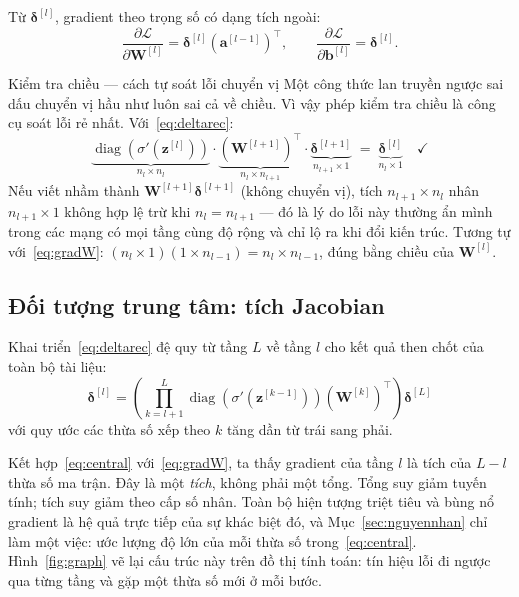 Từ $\boldsymbol{\delta}^{[l]}$, gradient theo trọng số có dạng tích ngoài:
\begin{equation}
  \frac{\partial\mathcal{L}}{\partial\mathbf{W}^{[l]}}
  = \boldsymbol{\delta}^{[l]}\left(\mathbf{a}^{[l-1]}\right)^{\!\top},
  \qquad
  \frac{\partial\mathcal{L}}{\partial\mathbf{b}^{[l]}}
  = \boldsymbol{\delta}^{[l]}.
  \label{eq:gradW}
\end{equation}

\begin{examplebox}{Kiểm tra chiều --- cách tự soát lỗi chuyển vị}
Một công thức lan truyền ngược sai dấu chuyển vị hầu như luôn sai cả về chiều.
Vì vậy phép kiểm tra chiều là công cụ soát lỗi rẻ nhất. Với~\eqref{eq:deltarec}:
\[
  \underbrace{\operatorname{diag}\!\left(\sigma'(\mathbf{z}^{[l]})\right)}_{n_l\times n_l}
  \cdot
  \underbrace{\left(\mathbf{W}^{[l+1]}\right)^{\!\top}}_{n_l\times n_{l+1}}
  \cdot
  \underbrace{\boldsymbol{\delta}^{[l+1]}}_{n_{l+1}\times 1}
  \;=\;
  \underbrace{\boldsymbol{\delta}^{[l]}}_{n_l\times 1}\quad\checkmark
\]
Nếu viết nhầm thành $\mathbf{W}^{[l+1]}\boldsymbol{\delta}^{[l+1]}$ (không chuyển
vị), tích $n_{l+1}\times n_l$ nhân $n_{l+1}\times 1$ không hợp lệ trừ khi
$n_l = n_{l+1}$ --- đó là lý do lỗi này thường ẩn mình trong các mạng có mọi tầng
cùng độ rộng và chỉ lộ ra khi đổi kiến trúc. Tương tự
với~\eqref{eq:gradW}: $(n_l\times 1)(1\times n_{l-1}) = n_l\times n_{l-1}$, đúng
bằng chiều của $\mathbf{W}^{[l]}$.
\end{examplebox}

\subsection{Đối tượng trung tâm: tích Jacobian}

Khai triển~\eqref{eq:deltarec} đệ quy từ tầng $L$ về tầng $l$ cho kết quả then
chốt của toàn bộ tài liệu:
\begin{equation}
  \boxed{\;
  \boldsymbol{\delta}^{[l]}
  = \left(\prod_{k=l+1}^{L}
      \operatorname{diag}\!\left(\sigma'\!\left(\mathbf{z}^{[k-1]}\right)\right)
      \left(\mathbf{W}^{[k]}\right)^{\!\top}
    \right)\boldsymbol{\delta}^{[L]}\;}
  \label{eq:central}
\end{equation}
với quy ước các thừa số xếp theo $k$ tăng dần từ trái sang phải.

Kết hợp~\eqref{eq:central} với~\eqref{eq:gradW}, ta thấy gradient của tầng $l$ là
tích của $L-l$ thừa số ma trận. Đây là một \emph{tích}, không phải một tổng. Tổng
suy giảm tuyến tính; tích suy giảm theo cấp số nhân. Toàn bộ hiện tượng triệt
tiêu và bùng nổ gradient là hệ quả trực tiếp của sự khác biệt đó, và
Mục~\ref{sec:nguyennhan} chỉ làm một việc: ước lượng độ lớn của mỗi thừa số
trong~\eqref{eq:central}. Hình~\ref{fig:graph} vẽ lại cấu trúc này trên đồ thị
tính toán: tín hiệu lỗi đi ngược qua từng tầng và gặp một thừa số mới ở mỗi bước.

